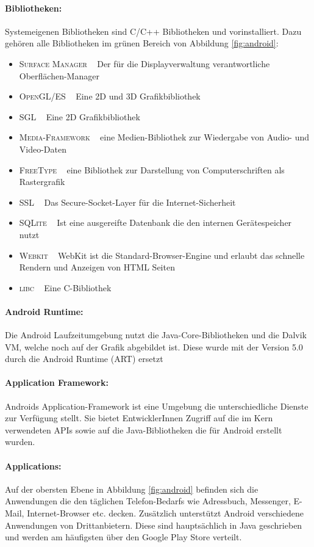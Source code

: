 \paragraph{Bibliotheken: }
Systemeigenen Bibliotheken sind C/C++ Bibliotheken und vorinstalliert. Dazu gehören alle Bibliotheken im grünen Bereich von Abbildung \ref{fig:android}:
\begin{itemize}[leftmargin=0.7cm]
\renewcommand\labelitemi{--}
	\item \textsc{Surface Manager} ~ Der für die Displayverwaltung verantwortliche Oberflächen-Manager
	\item \textsc{OpenGL/ES} ~ Eine 2D und 3D Grafikbibliothek
	\item \textsc{SGL} ~ Eine 2D Grafikbibliothek
 	\item \textsc{Media-Framework} ~ eine Medien-Bibliothek zur Wiedergabe von Audio- und Video-Daten 	
 	\item \textsc{FreeType} ~ eine Bibliothek zur Darstellung von Computerschriften als Rastergrafik
 	\item \textsc{SSL} ~ Das Secure-Socket-Layer für die Internet-Sicherheit
	\item \textsc{SQLite} ~ Ist eine ausgereifte Datenbank die den internen Gerätespeicher nutzt 
	\item \textsc{Webkit} ~ WebKit ist die Standard-Browser-Engine und erlaubt das schnelle Rendern und Anzeigen von HTML Seiten
	\item \textsc{libc} ~ Eine C-Bibliothek
\end{itemize}
\paragraph{Android Runtime: }
Die Android Laufzeitumgebung nutzt die Java-Core-Bibliotheken und die Dalvik \gls{VM}, welche noch auf der Grafik abgebildet ist. Diese wurde mit der Version 5.0 durch die Android Runtime (ART) ersetzt\cite{android_5}
\paragraph{Application Framework: }
Androids Application-Framework ist eine Umgebung die unterschiedliche Dienste zur Verfügung stellt. Sie bietet EntwicklerInnen Zugriff auf die im Kern verwendeten \glspl{API} sowie auf die Java-Bibliotheken die für Android erstellt wurden. 
\paragraph{Applications: }
Auf der obersten Ebene in Abbildung \ref{fig:android} befinden sich die Anwendungen die den täglichen Telefon-Bedarfs wie Adressbuch, Messenger, E-Mail, Internet-Browser etc. decken. Zusätzlich unterstützt Android verschiedene Anwendungen von Drittanbietern. Diese sind hauptsächlich in Java geschrieben und werden am häufigsten über den Google Play Store verteilt.
%
